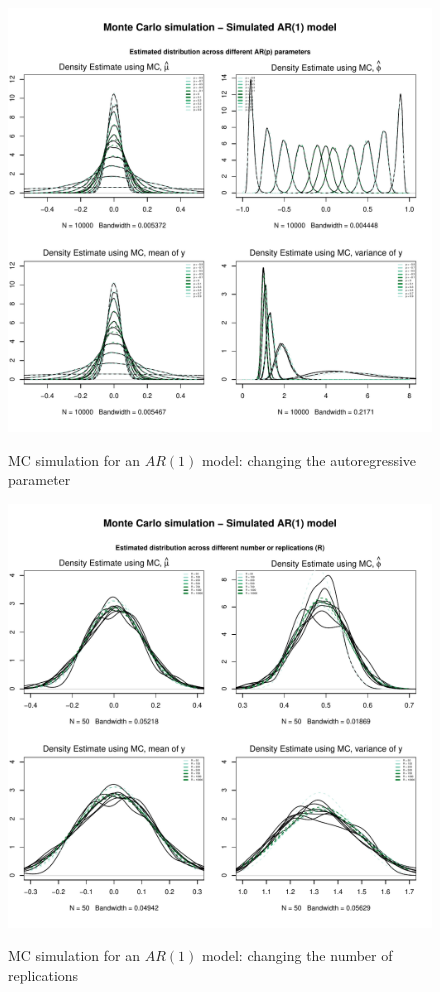 \documentclass{article}
\begin{document}
\begin{figure}[hbt!]
\includegraphics[width=\textwidth]{plots/MC_AR1_densities_diff_ARq}
\label{fig:MC_AR1_densities_diff_ARq}
\caption{MC simulation for an $AR(1)$ model: changing the autoregressive parameter}
\centering
\end{figure}

\begin{figure}[hbt!]
\includegraphics[width=\textwidth]{plots/MC_AR1_densities_diff_norepl}
\label{fig:MC_AR1_densities_diff_norepl}
\caption{MC simulation for an $AR(1)$ model: changing the number of replications}
\centering
\end{figure}
\end{document}
